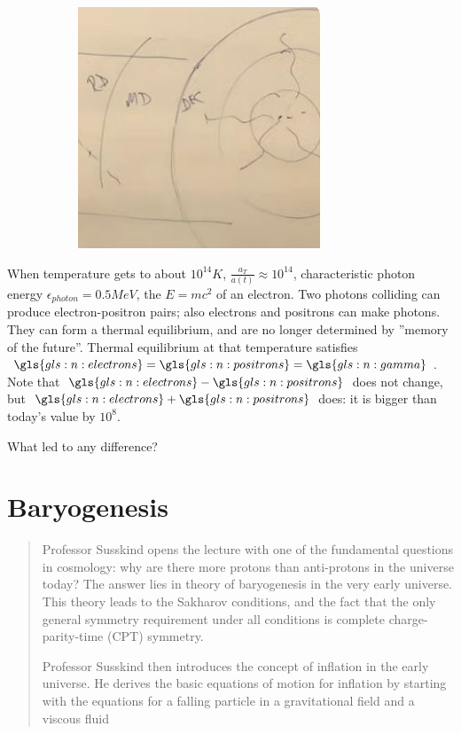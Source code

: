 \documentclass[]{article}
\begin{document}
\begin{figure}[H]
\begin{subfigure}[t]{0.45\textwidth}
		\includegraphics[width=\textwidth]{cosmo-7-universe-2}
	\end{subfigure}
\end{figure}

When temperature gets to about $10^{14}K$, $\frac{a_T}{a(t)}\approx 10^{14}$, characteristic photon energy $\epsilon_{photon}=0.5MeV$,  the $E=mc^2$ of an electron. Two photons colliding can produce electron-positron pairs; also electrons and positrons can make photons. They can form a thermal equilibrium, and are no longer determined by ''memory of the future''. Thermal equilibrium at that temperature satisfies $\gls{gls:n:electrons}=\gls{gls:n:positrons}=\gls{gls:n:gamma}$. Note that  $\gls{gls:n:electrons}-\gls{gls:n:positrons}$ does not change, but $\gls{gls:n:electrons}+\gls{gls:n:positrons}$ does: it is bigger than today's value by $10^8$.

What led to any difference?



\section{Baryogenesis}

\begin{quotation}
	Professor Susskind opens the lecture with one of the fundamental questions in cosmology: why are there more protons than anti-protons in the universe today? The answer lies in theory of baryogenesis in the very early universe.  This theory leads to the Sakharov conditions, and the fact that the only general symmetry requirement under all conditions is complete charge-parity-time (CPT) symmetry.
	
	Professor Susskind then introduces the concept of inflation in the early universe.  He derives the basic equations of motion for inflation by starting with the equations for a falling particle in a gravitational field and a viscous fluid
\end{quotation}
\end{document}
